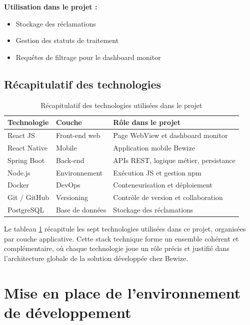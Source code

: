 \textbf{Utilisation dans le projet :}
\begin{itemize}
    \item Stockage des réclamations
    \item Gestion des statuts de traitement
    \item Requêtes de filtrage pour le dashboard monitor
\end{itemize}

\subsection{Récapitulatif des technologies}

\begin{table}[H]
\centering
\caption{Récapitulatif des technologies utilisées dans le projet}
\label{tab:recap_technologies}
\renewcommand{\arraystretch}{1.5}
\begin{tabular}{|p{3cm}|p{3cm}|p{6cm}|}
\hline
\textbf{Technologie} & \textbf{Couche} & \textbf{Rôle dans le projet} \\
\hline
React JS & Front-end web & Page WebView et dashboard monitor \\
\hline
React Native & Mobile & Application mobile Bewize \\
\hline
Spring Boot & Back-end & APIs REST, logique métier, persistance \\
\hline
Node.js & Environnement & Exécution JS et gestion npm \\
\hline
Docker & DevOps & Conteneurisation et déploiement \\
\hline
Git / GitHub & Versioning & Contrôle de version et collaboration \\
\hline
PostgreSQL & Base de données & Stockage des réclamations \\
\hline
\end{tabular}
\end{table}

Le tableau \ref{tab:recap_technologies} récapitule les sept technologies 
utilisées dans ce projet, organisées par couche applicative. Cette stack 
technique forme un ensemble cohérent et complémentaire, où chaque 
technologie joue un rôle précis et justifié dans l'architecture globale 
de la solution développée chez Bewize.

\section{Mise en place de l'environnement de développement}

